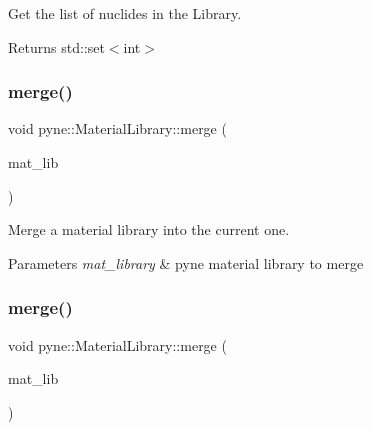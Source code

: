 Get the list of nuclides in the Library. 

\begin{DoxyReturn}{Returns}
std\+::set$<$int$>$ 
\end{DoxyReturn}
\mbox{\label{classpyne_1_1_material_library_a9185526712a0bc540c9ca43b1fc02dd4}} 
\subsubsection{\texorpdfstring{merge()}{merge()}\hspace{0.1cm}{\footnotesize\ttfamily [1/2]}}
{\footnotesize\ttfamily void pyne\+::\+Material\+Library\+::merge (\begin{DoxyParamCaption}\item[{const \hyperlink{classpyne_1_1_material_library}{pyne\+::\+Material\+Library} \&}]{mat\+\_\+lib }\end{DoxyParamCaption})}



Merge a material library into the current one. 


\begin{DoxyParams}{Parameters}
{\em mat\+\_\+library} & pyne material library to merge \\
\hline
\end{DoxyParams}
\mbox{\label{classpyne_1_1_material_library_afce914be857b938191b0322615bbd8f4}} 
\subsubsection{\texorpdfstring{merge()}{merge()}\hspace{0.1cm}{\footnotesize\ttfamily [2/2]}}
{\footnotesize\ttfamily void pyne\+::\+Material\+Library\+::merge (\begin{DoxyParamCaption}\item[{\hyperlink{classpyne_1_1_material_library}{pyne\+::\+Material\+Library} $\ast$}]{mat\+\_\+lib }\end{DoxyParamCaption})}



